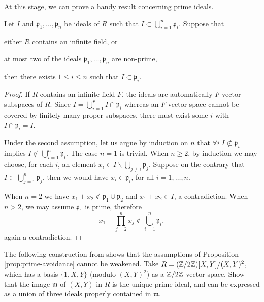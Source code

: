 At this stage, we can prove a handy result concerning prime ideals.
\begin{proposition}\label{prop:prime-avoidance} 
	Let $I$ and $\mathfrak{p}_1, \ldots, \mathfrak{p}_n$ be ideals of $R$ such that $I \subset \bigcup_{i=1}^n \mathfrak{p}_i$. Suppose that
	\begin{compactitem}
		\item either $R$ contains an infinite field, or
		\item at most two of the ideals $\mathfrak{p}_1, \ldots, \mathfrak{p}_n$ are non-prime,
	\end{compactitem}
	then there exists $1 \leq i \leq n$ such that $I \subset \mathfrak{p}_i$.
\end{proposition}
\begin{proof}
	If $R$ contains an infinite field $F$, the ideals are automatically $F$-vector subspaces of $R$. Since $I = \bigcup_{i=1}^r I \cap \mathfrak{p}_i$ whereas an $F$-vector space cannot be covered by finitely many proper subspaces, there must exist some $i$ with $I \cap \mathfrak{p}_i = I$.

	Under the second assumption, let us argue by induction on $n$ that $\forall i \; I \not\subset \mathfrak{p}_i$ implies $I \not\subset \bigcup_{i=1}^n \mathfrak{p}_i$. The case $n=1$ is trivial. When $n \geq 2$, by induction we may choose, for each $i$, an element $x_i \in I \smallsetminus \bigcup_{j \neq i} \mathfrak{p}_j$. Suppose on the contrary that $I \subset \bigcup_{j=1}^n \mathfrak{p}_j$, then we would have $x_i \in \mathfrak{p}_i$, for all $i=1, \ldots, n$.

	When $n=2$ we have $x_1 + x_2 \notin \mathfrak{p}_1 \cup \mathfrak{p}_2$ and $x_1 + x_2 \in I$, a contradiction. When $n > 2$, we may assume $\mathfrak{p}_1$ is prime, therefore
	\[ x_1 + \prod_{j=2}^n x_j \notin \bigcup_{i=1}^n \mathfrak{p}_i, \]
	again a contradiction.
\end{proof}

\begin{exercise}
	The following construction from \cite[Exercise 3.17]{Eis95} shows that the assumptions of Proposition \ref{prop:prime-avoidance} cannot be weakened. Take $R = (\mathbb{Z}/2\mathbb{Z})[X, Y] / (X,Y)^2$, which has a basis $\{1, X, Y\}$ (modulo $(X,Y)^2$) as a $\mathbb{Z}/2\mathbb{Z}$-vector space. Show that the image $\mathfrak{m}$ of $(X, Y)$ in $R$ is the unique prime ideal, and can be expressed as a union of three ideals properly contained in $\mathfrak{m}$.
\end{exercise}

